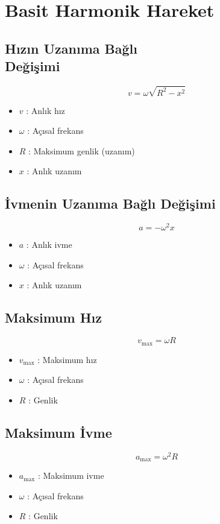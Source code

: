\documentclass[a4paper, 11pt, titlepage]{article}
\begin{document}
 \section{Basit Harmonik Hareket}
 \subsection[Hızın Uzanıma Bağlı Değişimi]{Hızın Uzanıma Bağlı \\Değişimi}
 \[
 v = \omega \sqrt{R^2 - x^2}
 \]
 \begin{itemize}
   \item $v$ : Anlık hız
   \item $\omega$ : Açısal frekans
   \item $R$ : Maksimum genlik (uzanım)
   \item $x$ : Anlık uzanım
 \end{itemize}

\subsection{İvmenin Uzanıma Bağlı Değişimi}
\[
a = -\omega^2 x
\]
\begin{itemize}
  \item $a$ : Anlık ivme
  \item $\omega$ : Açısal frekans
  \item $x$ : Anlık uzanım
\end{itemize}

\subsection{Maksimum Hız}
\[
v_{\mathrm{max}} = \omega R
\]
\begin{itemize}
  \item $v_{\mathrm{max}}$ : Maksimum hız
  \item $\omega$ : Açısal frekans
  \item $R$ : Genlik
\end{itemize}

\subsection{Maksimum İvme}
\[
a_{\mathrm{max}} = \omega^2 R
\]
\begin{itemize}
  \item $a_{\mathrm{max}}$ : Maksimum ivme
  \item $\omega$ : Açısal frekans
  \item $R$ : Genlik
\end{itemize}
\end{document}
